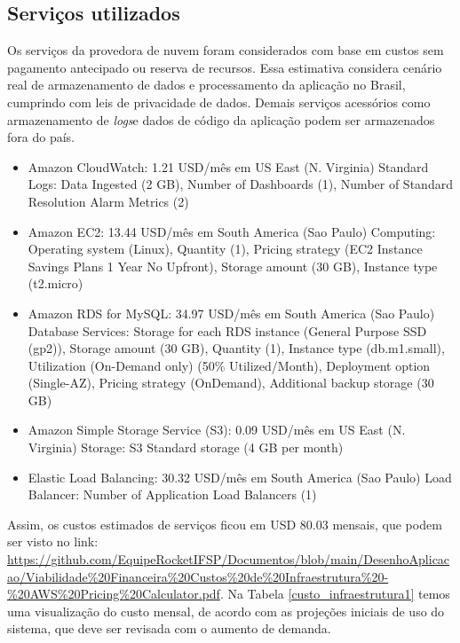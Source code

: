 \documentclass[
    12pt,               %
    openright,          %
    oneside,
    a4paper,            %
    BIBLATEX,           %
    TODO,               %
    english,            %
    brazil              %
    ]{ifsp-spo-inf-ctds}
\begin{document}
        \subsection{Serviços utilizados}
        
            Os serviços da provedora de nuvem foram considerados com base em custos sem pagamento antecipado ou reserva de recursos. Essa estimativa considera cenário real de armazenamento de dados e processamento da aplicação no Brasil, cumprindo com leis de privacidade de dados. Demais serviços acessórios como armazenamento de \emph{logs}e dados de código da aplicação podem ser armazenados fora do país.

            \begin{itemize}
            
                \item Amazon CloudWatch: 1.21 USD/mês em US East (N. Virginia) Standard Logs: Data Ingested (2 GB), Number of Dashboards (1), Number of Standard Resolution Alarm Metrics (2)
                
                \item Amazon EC2: 13.44 USD/mês em South America (Sao Paulo) Computing: Operating system (Linux), Quantity (1), Pricing strategy (EC2 Instance Savings Plans 1 Year No Upfront), Storage amount (30 GB), Instance type (t2.micro)
                
                \item Amazon RDS for MySQL: 34.97 USD/mês em South America (Sao Paulo) Database Services: Storage for each RDS instance (General Purpose SSD (gp2)), Storage amount (30 GB), Quantity (1), Instance type (db.m1.small), Utilization (On-Demand only) (50\% Utilized/Month), Deployment option (Single-AZ), Pricing strategy (OnDemand), Additional backup storage (30 GB)
                
                \item Amazon Simple Storage Service (S3): 0.09 USD/mês em US East (N. Virginia) Storage: S3 Standard storage (4 GB per month)
                
                \item Elastic Load Balancing: 30.32 USD/mês em South America (Sao Paulo) Load Balancer: Number of Application Load Balancers (1)
                
            \end{itemize}  


            Assim, os custos estimados de serviços ficou em USD 80.03 mensais, que podem ser visto no link: \url{https://github.com/EquipeRocketIFSP/Documentos/blob/main/DesenhoAplicacao/Viabilidade\%20Financeira\%20Custos\%20de\%20Infraestrutura\%20-\%20AWS\%20Pricing\%20Calculator.pdf}. Na Tabela \ref{custo_infraestrutura1} temos uma visualização do custo mensal, de acordo com as projeções iniciais de uso do sistema, que deve ser revisada com o aumento de demanda.
        
\end{document}
